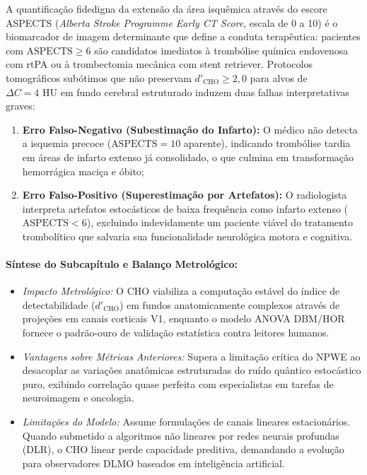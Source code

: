 \documentclass[
  12pt,
  a4paper,
  oneside
]{report}
\begin{document}
A quantificação fidedigna da extensão da área isquêmica através do escore ASPECTS (\emph{Alberta Stroke Programme Early CT Score}, escala de 0 a 10) é o biomarcador de imagem determinante que define a conduta terapêutica: pacientes com $\text{ASPECTS} \ge 6$ são candidatos imediatos à trombólise química endovenosa com rtPA ou à trombectomia mecânica com stent retriever. Protocolos tomográficos subótimos que não preservam $d'_{\text{CHO}} \ge 2{,}0$ para alvos de $\Delta C = 4\text{ HU}$ em fundo cerebral estruturado induzem duas falhas interpretativas graves:
\begin{enumerate}
  \item \textbf{Erro Falso-Negativo (Subestimação do Infarto):} O médico não detecta a isquemia precoce ($\text{ASPECTS} = 10$ aparente), indicando trombólise tardia em áreas de infarto extenso já consolidado, o que culmina em transformação hemorrágica maciça e óbito;
  \item \textbf{Erro Falso-Positivo (Superestimação por Artefatos):} O radiologista interpreta artefatos estocásticos de baixa frequência como infarto extenso ($\text{ASPECTS} < 6$), excluindo indevidamente um paciente viável do tratamento trombolítico que salvaria sua funcionalidade neurológica motora e cognitiva.
\end{enumerate}

\paragraph{Síntese do Subcapítulo e Balanço Metrológico:}
\begin{itemize}
  \item \emph{Impacto Metrológico:} O CHO viabiliza a computação estável do índice de detectabilidade ($d'_{\text{CHO}}$) em fundos anatomicamente complexos através de projeções em canais corticais V1, enquanto o modelo ANOVA DBM/HOR fornece o padrão-ouro de validação estatística contra leitores humanos.
  \item \emph{Vantagens sobre Métricas Anteriores:} Supera a limitação crítica do NPWE ao desacoplar as variações anatômicas estruturadas do ruído quântico estocástico puro, exibindo correlação quase perfeita com especialistas em tarefas de neuroimagem e oncologia.
  \item \emph{Limitações do Modelo:} Assume formulações de canais lineares estacionários. Quando submetido a algoritmos não lineares por redes neurais profundas (DLR), o CHO linear perde capacidade preditiva, demandando a evolução para observadores DLMO baseados em inteligência artificial.
\end{itemize}
\end{document}
